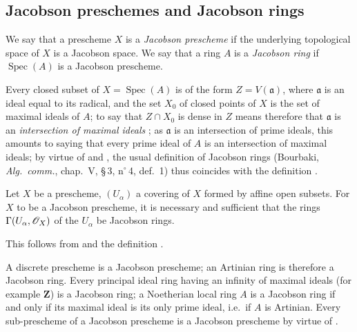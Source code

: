 \subsection{Jacobson preschemes and Jacobson rings}
\label{subsection:IV.10.4}

\begin{definition}[10.4.1]
\label{IV.10.4.1}
We say that a prescheme $X$ is a \emph{Jacobson prescheme} if the underlying topological space of $X$ is a Jacobson space.
We say that a ring $A$ is a \emph{Jacobson ring} if $\operatorname{Spec}(A)$ is a Jacobson prescheme.
\end{definition}

Every closed subset of $X=\operatorname{Spec}(A)$ is of the form $Z=V(\mathfrak{a})$, where $\mathfrak{a}$ is an ideal equal to its radical, and the set $X_0$ of closed points of $X$ is the set of maximal ideals of $A$; to say that $Z\cap X_0$ is dense in $Z$ means therefore that $\mathfrak{a}$ is an \emph{intersection of maximal ideals} ; as $\mathfrak{a}$ is an intersection of prime ideals, this amounts to saying that every prime ideal of $A$ is an intersection of maximal ideals; by virtue of  and , the usual definition of Jacobson rings (Bourbaki, \emph{Alg.\ comm.}, chap.~V, \S\,3, n$^\circ$\,4, def.~1) thus coincides with the definition .

\begin{proposition}[10.4.2]
\label{IV.10.4.2}
Let $X$ be a prescheme, $(U_\alpha)$ a covering of $X$ formed by affine open subsets.
For $X$ to be a Jacobson prescheme, it is necessary and sufficient that the rings $\Gamma(U_\alpha,\mathscr{O}_X)$ of the $U_\alpha$ be Jacobson rings.
\end{proposition}

This follows from  and the definition .

\begin{env}[10.4.3]
\label{IV.10.4.3}
A discrete prescheme is a Jacobson prescheme; an Artinian ring is therefore a Jacobson ring.
Every principal ideal ring having an infinity of maximal ideals (for example $\mathbf{Z}$) is a Jacobson ring; a Noetherian local ring $A$ is a Jacobson ring if and only if its maximal ideal is its only prime ideal, i.e.\ if $A$ is Artinian.
Every sub-prescheme of a Jacobson prescheme is a Jacobson prescheme by virtue of .
\end{env}

